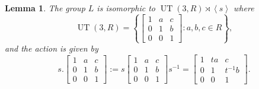 \documentclass[11pt]{amsart}
\newtheorem{lem}[thm]{Lemma}
\theoremstyle{definition}
\DeclareMathOperator{\UT}{UT}
\begin{document}
 \begin{lem} \label{lem:L structure}
The group $L$ is isomorphic to $\UT(3,R) \rtimes \left< s \right>$ where $$\UT(3,R)=\left \{ 
\begin{bmatrix}
1 & a & c \\ 0 & 1 & b \\ 0 & 0 & 1
\end{bmatrix} : a,b,c \in R
\right \},$$
and the action is given by $$s.\begin{bmatrix}
1 & a & c \\ 0 & 1 & b \\ 0 & 0 & 1
\end{bmatrix} := s\begin{bmatrix}
1 & a & c \\ 0 & 1 & b \\ 0 & 0 & 1
\end{bmatrix}s^{-1}=\begin{bmatrix}
1 & ta & c \\ 0 & 1 & t^{-1}b \\ 0 & 0 & 1
\end{bmatrix}.$$
\end{lem}
\end{document}
